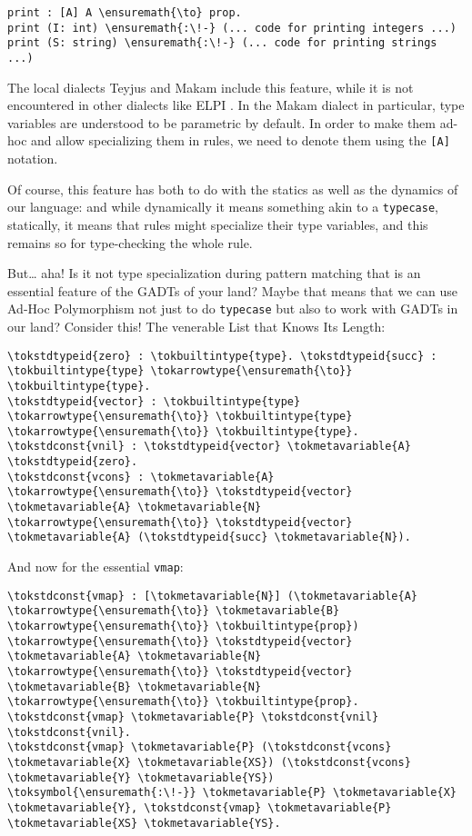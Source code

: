 \begin{verbatim}
print : [A] A \ensuremath{\to} prop.
print (I: int) \ensuremath{:\!-} (... code for printing integers ...)
print (S: string) \ensuremath{:\!-} (... code for printing strings ...)
\end{verbatim}

The local dialects Teyjus
\citep{teyjus-main-reference,teyjus-2-implementation} and Makam include
this feature, while it is not encountered in other dialects like ELPI
\citep{elpi-main-reference}. In the Makam dialect in particular, type
variables are understood to be parametric by default. In order to make
them ad-hoc and allow specializing them in rules, we need to denote them
using the \texttt{{[}A{]}} notation.

Of course, this feature has both to do with the statics as well as the
dynamics of our language: and while dynamically it means something akin
to a \texttt{typecase}, statically, it means that rules might specialize
their type variables, and this remains so for type-checking the whole
rule.

But\ldots{} aha! Is it not type specialization during pattern matching
that is an essential feature of the GADTs of your land? Maybe that means
that we can use Ad-Hoc Polymorphism not just to do \texttt{typecase} but
also to work with GADTs in our land? Consider this! The venerable List
that Knows Its Length:

\begin{verbatim}
\tokstdtypeid{zero} : \tokbuiltintype{type}. \tokstdtypeid{succ} : \tokbuiltintype{type} \tokarrowtype{\ensuremath{\to}} \tokbuiltintype{type}.
\tokstdtypeid{vector} : \tokbuiltintype{type} \tokarrowtype{\ensuremath{\to}} \tokbuiltintype{type} \tokarrowtype{\ensuremath{\to}} \tokbuiltintype{type}.
\tokstdconst{vnil} : \tokstdtypeid{vector} \tokmetavariable{A} \tokstdtypeid{zero}.
\tokstdconst{vcons} : \tokmetavariable{A} \tokarrowtype{\ensuremath{\to}} \tokstdtypeid{vector} \tokmetavariable{A} \tokmetavariable{N} \tokarrowtype{\ensuremath{\to}} \tokstdtypeid{vector} \tokmetavariable{A} (\tokstdtypeid{succ} \tokmetavariable{N}).
\end{verbatim}

And now for the essential \texttt{vmap}:

\begin{verbatim}
\tokstdconst{vmap} : [\tokmetavariable{N}] (\tokmetavariable{A} \tokarrowtype{\ensuremath{\to}} \tokmetavariable{B} \tokarrowtype{\ensuremath{\to}} \tokbuiltintype{prop}) \tokarrowtype{\ensuremath{\to}} \tokstdtypeid{vector} \tokmetavariable{A} \tokmetavariable{N} \tokarrowtype{\ensuremath{\to}} \tokstdtypeid{vector} \tokmetavariable{B} \tokmetavariable{N} \tokarrowtype{\ensuremath{\to}} \tokbuiltintype{prop}.
\tokstdconst{vmap} \tokmetavariable{P} \tokstdconst{vnil} \tokstdconst{vnil}.
\tokstdconst{vmap} \tokmetavariable{P} (\tokstdconst{vcons} \tokmetavariable{X} \tokmetavariable{XS}) (\tokstdconst{vcons} \tokmetavariable{Y} \tokmetavariable{YS}) \toksymbol{\ensuremath{:\!-}} \tokmetavariable{P} \tokmetavariable{X} \tokmetavariable{Y}, \tokstdconst{vmap} \tokmetavariable{P} \tokmetavariable{XS} \tokmetavariable{YS}.
\end{verbatim}

